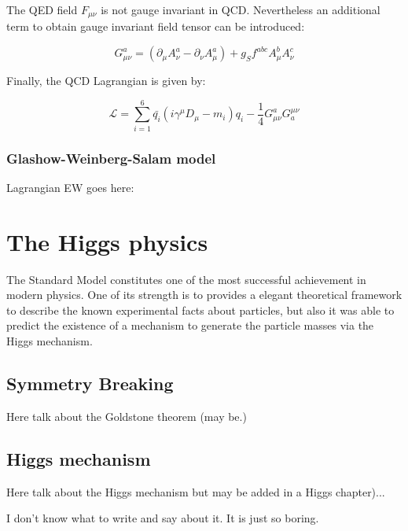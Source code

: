     The QED field $F_{\mu \nu}$ is not gauge invariant in QCD.
    Nevertheless an additional term to obtain gauge invariant field tensor can be introduced:
    
    \begin{equation}
      G^a_{\mu \nu} = \left( \partial_{\mu} A^a_{\nu} - \partial_{\nu} A^a_{\mu} \right) + g_S f^{abc} A^b_{\mu} A^c_{\nu}
    \end{equation} 

    Finally, the QCD Lagrangian is given by:

    \begin{equation}
      \mathcal{L} = \sum_{i=1}^6  \bar{q_i} \left(i \gamma^{\mu}D_{\mu} -m_i \right)q_i - \frac{1}{4} G_{\mu \nu}^{a} G_{a}^{\mu \nu}
    \end{equation}
    
    \subsubsection{Glashow-Weinberg-Salam model}
  
    Lagrangian EW goes here: 

  \section{The Higgs physics}

    The Standard Model constitutes one of the most successful achievement in modern physics.
    One of its strength is to provides a elegant theoretical framework to describe the known experimental facts about particles, but also it was able to predict 
    the existence of a mechanism to generate the particle masses via the Higgs mechanism.

    \subsection{Symmetry Breaking}

    Here talk about the Goldstone theorem (may be.)

    \subsection{Higgs mechanism}

    Here talk about the Higgs mechanism but may be added in a Higgs chapter)...

    I don't know what to write and say about it. It is just so boring.


